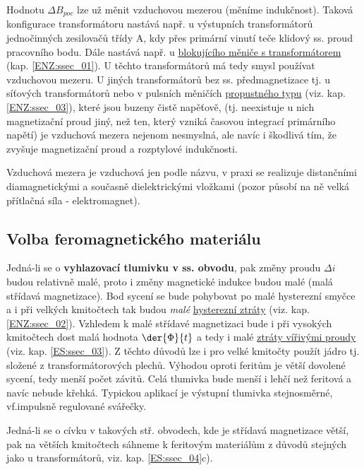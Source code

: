       Hodnotu \(\Delta B_{poc}\) lze už měnit vzduchovou mezerou (měníme indukčnost). Taková 
      konfigurace transformátoru nastává např. u výstupních transformátorů jednočinných zesilovačů 
      třídy A, kdy přes primární vinutí teče klidový ss. proud pracovního bodu. Dále nastává např. 
      u \hyperlink{ENZ:ssec_01}{blokujícího měniče s transformátorem} (kap. \ref{ENZ:ssec_01}). U 
      těchto transformátorů má tedy smysl používat vzduchovou mezeru. U jiných transformátorů bez 
      ss. předmagnetizace tj. u síťových transformátorů nebo v pulsních měničích 
      \hyperlink{ENZ:ssec_03}{propustného typu} (viz. kap. \ref{ENZ:ssec_03}), které jsou buzeny 
      čistě napěťově, (tj. neexistuje u nich magnetizační proud jiný, než ten, který vzniká 
      časovou integrací primárního napětí) je vzduchová mezera nejenom nesmyslná, ale navíc i 
      škodlivá tím, že zvyšuje magnetizační proud a rozptylové indukčnosti.
      
      \begin{tcnote}
        Vzduchová mezera je vzduchová jen podle názvu, v praxi se realizuje distančními
        diamagnetickými a současně dielektrickými vložkami (pozor působí na ně velká přítlačná 
        síla - elektromagnet).
      \end{tcnote}
    
    \subsection{Volba feromagnetického materiálu}
      Jedná-li se o \textbf{vyhlazovací tlumivku v ss. obvodu}, pak změny proudu \(\Delta i\) budou
      relativně malé, proto i změny magnetické indukce budou malé (malá střídavá magnetizace). Bod
      sycení se bude pohybovat po malé hysterezní smyčce a i při velkých kmitočtech tak budou
      \emph{malé} \hyperlink{ENZ:ssec_02}{hysterezní ztráty} (viz. kap. \ref{ENZ:ssec_02}). Vzhledem
      k malé střídavé magnetizaci bude i při vysokých kmitočtech dost malá hodnota \(\der{\Phi}{t}\)
      a tedy i malé \hyperlink{ES:ssec_03}{ztráty vířivými proudy} (viz. kap. \ref{ES:ssec_03}). Z
      těchto důvodů lze i pro velké kmitočty použít jádro  tj. složené z
      transformátorových plechů. Výhodou oproti feritům je větší dovolené sycení, tedy menší počet
      závitů. Celá tlumivka bude menší i lehčí než feritová a navíc nebude křehká. Typickou aplikací
      je výstupní tlumivka stejnosměrné, vf.impulsně regulované svářečky.
      
      Jedná-li se o cívku v takových stř. obvodech, kde je střídavá magnetizace větší, pak na 
      větších kmitočtech sáhneme k feritovým materiálům z důvodů stejných jako u transformátorů, 
      viz. kap. \ref{ES:ssec_04}c).
    
